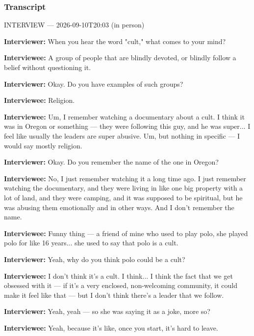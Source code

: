 \subsubsection*{Transcript}
INTERVIEW — 2026-09-10T20:03 (in person)

\textbf{Interviewer:} When you hear the word "cult," what comes to your mind?

\textbf{Interviewee:} A group of people that are blindly devoted, or blindly follow a belief without questioning it.

\textbf{Interviewer:} Okay. Do you have examples of such groups?

\textbf{Interviewee:} Religion.

\textbf{Interviewee:} Um, I remember watching a documentary about a cult. I think it was in Oregon or something — they were following this guy, and he was super... I feel like usually the leaders are super abusive. Um, but nothing in specific — I would say mostly religion.

\textbf{Interviewer:} Okay. Do you remember the name of the one in Oregon?

\textbf{Interviewee:} No, I just remember watching it a long time ago. I just remember watching the documentary, and they were living in like one big property with a lot of land, and they were camping, and it was supposed to be spiritual, but he was abusing them emotionally and in other ways. And I don't remember the name.

\textbf{Interviewee:} Funny thing — a friend of mine who used to play polo, she played polo for like 16 years... she used to say that polo is a cult.

\textbf{Interviewer:} Yeah, why do you think polo could be a cult?

\textbf{Interviewee:} I don't think it's a cult. I think... I think the fact that we get obsessed with it — if it's a very enclosed, non-welcoming community, it could make it feel like that — but I don't think there's a leader that we follow.

\textbf{Interviewer:} Yeah, yeah — so she was saying it as a joke, more so?

\textbf{Interviewee:} Yeah, because it's like, once you start, it's hard to leave.

